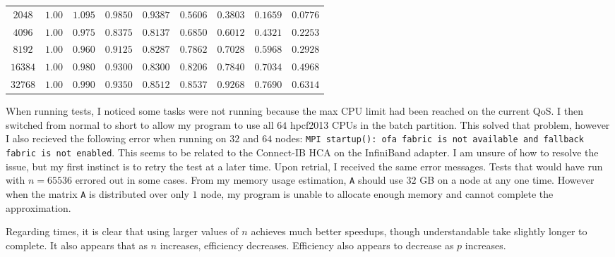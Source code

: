 \documentclass[11pt]{article}
\begin{document}
\begin{table}
{\begin{tabular}{ |c|c|c|c|c|c|c|c|c|  }
$2048  $&$ 1.00  $&$ 1.095  $&$ 0.9850  $&$ 0.9387  $&$ 0.5606  $&$ 0.3803 $&$ 0.1659 $&$ 0.0776  $\\
$4096  $&$ 1.00  $&$ 0.975  $&$ 0.8375  $&$ 0.8137  $&$ 0.6850 $&$ 0.6012 $&$ 0.4321 $&$ 0.2253 $\\
$8192  $&$ 1.00  $&$ 0.960  $&$ 0.9125  $&$ 0.8287  $&$ 0.7862 $&$ 0.7028 $&$ 0.5968 $&$ 0.2928 $\\
$16384 $&$ 1.00  $&$ 0.980  $&$ 0.9300  $&$ 0.8300  $&$ 0.8206 $&$ 0.7840 $&$ 0.7034 $&$ 0.4968 $\\
$32768 $&$ 1.00  $&$ 0.990  $&$ 0.9350  $&$ 0.8512  $&$ 0.8537 $&$ 0.9268 $&$ 0.7690 $&$ 0.6314 $\\
\hline
\hline
\end{tabular}
}
\end{table}
When running tests, I noticed some tasks were not running because the max CPU limit had been reached on the current QoS. I then switched from normal to short to allow my program to use all $64$ hpcf2013 CPUs in the batch partition. This solved that problem, however I also recieved the following error when running on $32$ and $64$ nodes: \texttt{MPI startup(): ofa fabric is not available and fallback fabric is not enabled}. This seems to be related to the Connect-IB HCA on the InfiniBand adapter. I am unsure of how to resolve the issue, but my first instinct is to retry the test at a later time. Upon retrial, I received the same error messages. Tests that would have run with $n=65536$ errored out in some cases. From my memory usage estimation, \texttt{A} should use $32$ GB on a node at any one time. However when the matrix \texttt{A} is distributed over only $1$ node, my program is unable to allocate enough memory and cannot complete the approximation.

Regarding times, it is clear that using larger values of $n$ achieves much better speedups, though understandable take slightly longer to complete. It also appears that as $n$ increases, efficiency decreases. Efficiency also appears to decrease as $p$ increases.
\end{document}
